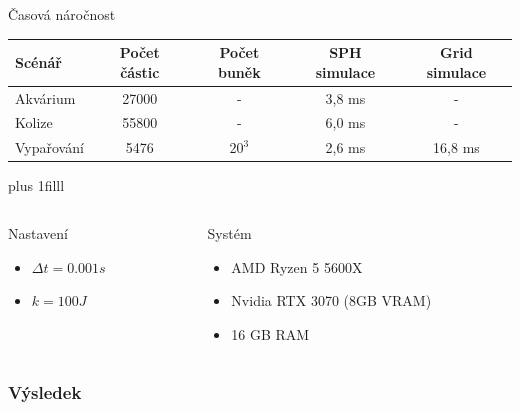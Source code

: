 \documentclass[10pt,xcolor=pdflatex,hyperref={unicode},aspectratio=169]{beamer}
\newcommand{\btVFill}{\vskip0pt plus 1filll}
\begin{document}

\begin{frame}{Časová náročnost}
    \bigskip
    \bigskip
    \bigskip
    \begin{table}[]
        \begin{tabular}{l|c|c|c|c}
            Scénář            & Počet částic & Počet buněk & SPH simulace & Grid simulace \\ \hline
            Akvárium & 27000        & -                                    & 3,8 ms       & -                                     \\
            Kolize            & 55800        & -                                    & 6,0 ms       & -                                     \\
            Vypařování        & 5476         & $20^3$                                   & 2,6 ms       & 16,8 ms                              
        \end{tabular}
    \end{table}
    \btVFill
    \begin{columns}[]
            \hspace{1.5cm}
            \begin{column}{0.49\textwidth}
                Nastavení
                \begin{itemize}
                    \item $\Delta t = 0.001s$
                    \item $k = 100J$
                \end{itemize}
                \vspace{\baselineskip}
            \end{column}
                \begin{column}{0.49\textwidth}
                Systém
            \begin{itemize}
                \item AMD Ryzen 5 5600X
                \item Nvidia RTX 3070 (8GB VRAM)
                \item 16 GB RAM
            \end{itemize}
            \end{column}
    \end{columns}
    \bigskip
    \bigskip
\end{frame}




\begin{frame}\frametitle{Výsledek}
\end{frame}
\end{document}
